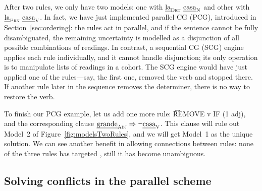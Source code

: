 After two rules, we only have two models: one with $\text{\em la}_{\text{\sc Det}} \ \text{\em casa}_{\text{\sc N}}$ and other with $\text{\em la}_{\text{\sc Prn}} \ \text{\em casa}_{\text{\sc V}}$. 
In fact, we have just implemented parallel CG (PCG), introduced in Section~\ref{sec:ordering}: the rules act in parallel, and if the sentence cannot be fully disambiguated, the remaining uncertainty is modelled as a disjunction of all possible combinations of readings.
In contrast, a sequential CG (SCG) engine applies each rule individually, and it cannot handle disjunction; its only operation is to manipulate lists of readings in a cohort.
The SCG engine would have just applied one of the rules---say, the first one, removed the verb and stopped there. If another rule later in the sequence removes the determiner, there is no way to restore the verb. 

To finish our PCG example, let us add one more rule: \t{REMOVE v IF (1 adj)}, and the corresponding clause $\text{\em grande}_{\text{\sc Adj}} \Rightarrow \neg \text{\em casa}_{\text{\sc V}}$. This clause will rule out Model~2 of Figure~\ref{fig:modelsTwoRules}, and we will get Model~1 as the unique solution. 
We can see another benefit in allowing connections between rules: none of the three rules has targeted \la{}, still it has become unambiguous. 





\subsection{Solving conflicts in the parallel scheme}
\label{sec:parallelScheme}

